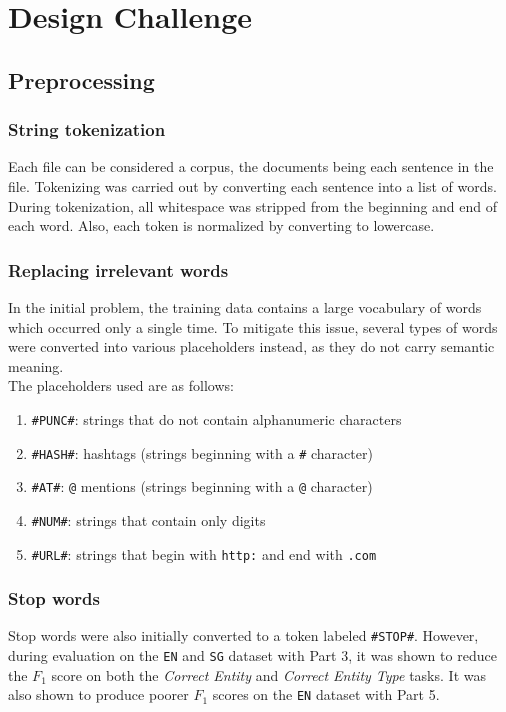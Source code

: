 \documentclass{article}
\numberwithin{equation}{section}
\begin{document}
\newpage

\section{Design Challenge}
\subsection{Preprocessing}
\subsubsection{String tokenization}
Each file can be considered a corpus, the documents being each sentence in the file. Tokenizing was carried out by converting each sentence into a list of words. During tokenization, all whitespace was stripped from the beginning and end of each word. Also, each token is normalized by converting to lowercase.

\subsubsection{Replacing irrelevant words}
In the initial problem, the training data contains a large vocabulary of words which occurred only a single time. To mitigate this issue, several types of words were converted into various placeholders instead, as they do not carry semantic meaning. \\

The placeholders used are as follows:
\begin{enumerate}
	\item \lstinline{#PUNC#}: strings that do not contain alphanumeric characters
	\item \lstinline{#HASH#}: hashtags (strings beginning with a \lstinline{#} character)
	\item \lstinline{#AT#}: \lstinline{@} mentions (strings beginning with a \lstinline{@} character)
	\item \lstinline{#NUM#}: strings that contain only digits
	\item \lstinline{#URL#}: strings that begin with \lstinline{http:} and end with \lstinline{.com}
\end{enumerate}

\subsubsection{Stop words}
Stop words were also initially converted to a token labeled \lstinline{#STOP#}. However, during evaluation on the \lstinline{EN} and \lstinline{SG} dataset with Part 3, it was shown to reduce the $F_1$ score on both the \emph{Correct Entity} and \emph{Correct Entity Type} tasks. It was also shown to produce poorer $F_1$ scores on the \lstinline{EN} dataset with Part 5. \\
\end{document}
